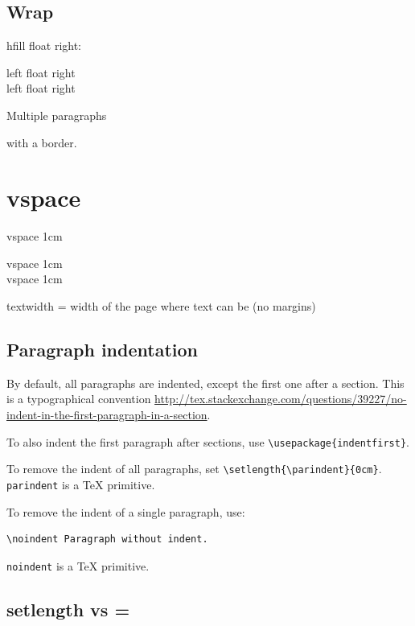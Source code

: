 \documentclass[12pt]{article}
\begin{document}
\subsection{Wrap}\label{wrap}

hfill float right:

left \hfill float right \\
left \hfill float right \\

\begin{boxedminipage}{\textwidth}
Multiple paragraphs

with a border.
\end{boxedminipage}

\section{vspace}\label{wrap}

vspace 1cm

\vspace{1cm}

vspace 1cm \\[1cm]

vspace 1cm

textwidth = width of the page where text can be (no margins)

\subsection{Paragraph indentation}\label{paragraph-indentation}

By default, all paragraphs are indented, except the first one after a section. This is a typographical convention \url{http://tex.stackexchange.com/questions/39227/no-indent-in-the-first-paragraph-in-a-section}.

To also indent the first paragraph after sections, use \lstinline|\usepackage{indentfirst}|.

To remove the indent of all paragraphs, set \lstinline|\setlength{\parindent}{0cm}|. \lstinline|parindent| is a TeX primitive.

To remove the indent of a single paragraph, use:

\begin{lstlisting}
\noindent Paragraph without indent.
\end{lstlisting}

\lstinline|noindent| is a TeX primitive.

\subsection{setlength vs =}\label{setlength-vs-eq}
\end{document}
